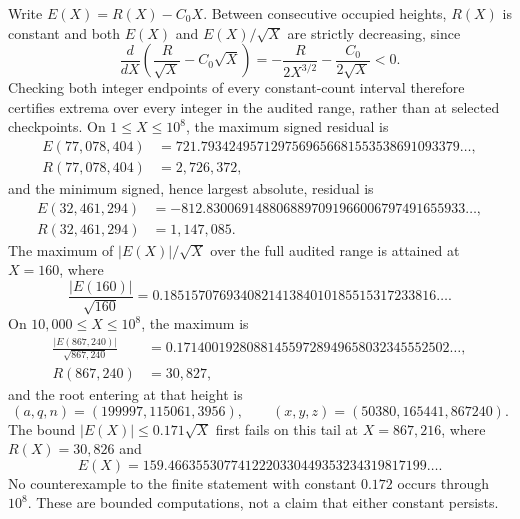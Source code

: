 Write \(E(X)=R(X)-C_0X\).  Between consecutive occupied heights,
\(R(X)\) is constant and both \(E(X)\) and
\(E(X)/\sqrt X\) are strictly decreasing, since
\begin{equation}
 \frac{d}{dX}\left(\frac{R}{\sqrt X}-C_0\sqrt X\right)
 =-\frac{R}{2X^{3/2}}-\frac{C_0}{2\sqrt X}<0.
 \label{koide-count-eq-census-monotonicity}
\end{equation}
Checking both integer endpoints of every constant-count interval therefore
certifies extrema over every integer in the audited range, rather than at
selected checkpoints.  On \(1\leq X\leq10^8\), the maximum signed residual
is
\begin{equation}
 \begin{aligned}
 E(77{,}078{,}404)
 &=721.7934249571297569656681553538691093379\ldots,\\
 R(77{,}078{,}404)&=2{,}726{,}372,
 \end{aligned}
 \label{koide-count-eq-census-max-positive}
\end{equation}
and the minimum signed, hence largest absolute, residual is
\begin{equation}
 \begin{aligned}
 E(32{,}461{,}294)
 &=-812.8300691488068897091966006797491655933\ldots,\\
 R(32{,}461{,}294)&=1{,}147{,}085.
 \end{aligned}
 \label{koide-count-eq-census-max-negative}
\end{equation}
The maximum of
\(\lvert E(X)\rvert/\sqrt X\) over the full audited range is attained at
\(X=160\), where
\[
 \frac{\lvert E(160)\rvert}{\sqrt{160}}
 =0.185157076934082141384010185515317233816\ldots.
\]
On \(10{,}000\leq X\leq10^8\), the maximum is
\begin{equation}
 \begin{aligned}
 \frac{\lvert E(867{,}240)\rvert}{\sqrt{867{,}240}}
 &=0.171400192808814559728949658032345552502\ldots,\\
 R(867{,}240)&=30{,}827,
 \end{aligned}
 \label{koide-count-eq-census-tail-extremum}
\end{equation}
and the root entering at that height is
\begin{equation}
 (a,q,n)=(199997,115061,3956),\qquad
 (x,y,z)=(50380,165441,867240).
 \label{koide-count-eq-census-tail-witness}
\end{equation}
The bound \(\lvert E(X)\rvert\leq0.171\sqrt X\) first fails on this tail at
\(X=867{,}216\), where \(R(X)=30{,}826\) and
\[
 E(X)=159.4663553077412220330449353234319817199\ldots.
\]
No counterexample to the finite statement with constant \(0.172\) occurs
through \(10^8\).  These are bounded computations, not a claim that either
constant persists.

